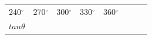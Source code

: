 \begin{center}
\begin{xtabular*}{\mytablewidth}[t]{|p{10\mystarwidth}|p{10\mystarwidth}|p{10\mystarwidth}|p{10\mystarwidth}|p{10\mystarwidth}|p{10\mystarwidth}|p{10\mystarwidth}|p{10\mystarwidth}|}
    
        240\begin{math}{}^{\circ }\end{math} &
    
    
        270\begin{math}{}^{\circ }\end{math} &
    
    
        300\begin{math}{}^{\circ }\end{math} &
    
    
        330\begin{math}{}^{\circ }\end{math} &
    
    
        360\begin{math}{}^{\circ }\end{math}%
     \tabularnewline{}
    
    
        
                  \begin{math}tan\theta \end{math}
                 &
    

\end{xtabular*}
\end{center}
